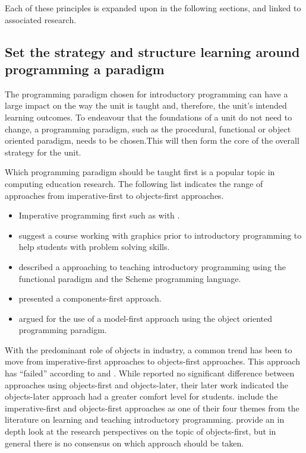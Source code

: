 %
%


Each of these principles is expanded upon in the following sections, and linked to associated research.


\subsection{Set the strategy and structure learning around programming a paradigm} %
\label{ssub:strategy_around_paradigm}

The programming paradigm chosen for introductory programming can have a large impact on the way the unit is taught and, therefore, the unit's intended learning outcomes. To endeavour that the foundations of a unit do not need to change, a programming paradigm, such as the procedural, functional or object oriented paradigm, needs to be chosen.This will then form the core of the overall strategy for the unit.

Which programming paradigm should be taught first is a popular topic in computing education research. The following list indicates the range of approaches from imperative-first to objects-first approaches.
\begin{itemize}[noitemsep,nolistsep]
	\item Imperative programming first such as with \citet{Koffman:1988a}.
	\item \citet{Cooper:2003} suggest a course working with graphics prior to introductory programming to help students with problem solving skills.
	\item \citet{Felleisen:2004} described a approaching to teaching introductory programming using the functional paradigm and the Scheme programming language.
	\item \citet{Howe:2004} presented a components-first approach.
	\item \citet{Bennedsen:2004} argued for the use of a model-first approach using the object oriented programming paradigm.
\end{itemize}

 With the predominant role of objects in industry, a common trend has been to move from imperative-first approaches to objects-first approaches. This approach has ``failed'' according to \citet{Astrachan:2005} and \citet{Reges:2006}. While \citet{Ehlert:2009} reported no significant difference between approaches using objects-first and objects-later, their later work \cite{Ehlert:2010} indicated the objects-later approach had a greater comfort level for students. \citet{Robins:2003} include the imperative-first and objects-first approaches as one of their four themes from the literature on learning and teaching introductory programming. \citet{Lister:2006a} provide an in depth look at the research perspectives on the topic of objects-first, but in general there is no consensus on which approach should be taken.

